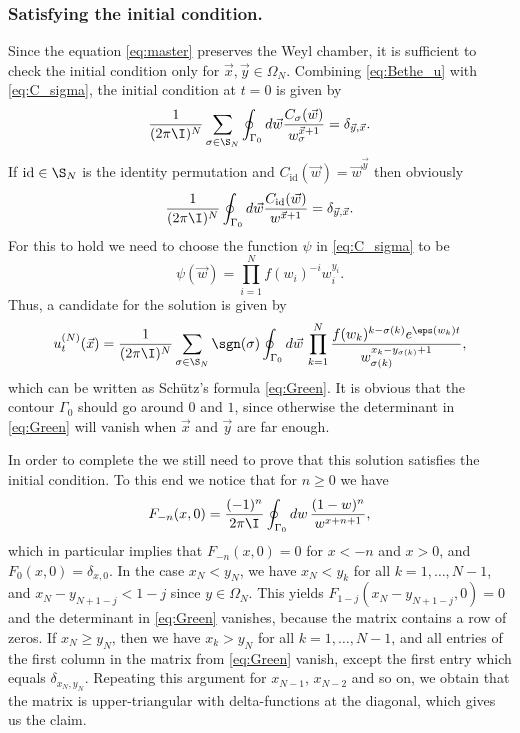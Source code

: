 \documentclass[]{pcmi}
\theoremstyle{plain}
\theoremstyle{definition}
\begin{document}
\subsubsection*{Satisfying the initial condition.}

Since the equation \eqref{eq:master} preserves the Weyl chamber, it is sufficient to check the initial condition only for $\vec x, \vec y \in \Omega_N$. Combining \eqref{eq:Bethe_u} with \eqref{eq:C_sigma}, the initial condition at $t = 0$ is given by
\begin{equation}\label{eq:u_init}
 	\frac{1}{(2\pi \I)^N} \sum_{\sigma \in \S_N} \oint_{\Gamma_0} d\vec w \frac{C_\sigma(\vec w)}{w_{\sigma}^{\vec x +1}} = \delta_{\vec y, \vec x}.
\end{equation}
If $\mathrm{id} \in \S_N$ is the identity permutation and $C_{\mathrm{id}}(\vec w) = \vec w^{\vec y}$ then obviously
\[
 	\frac{1}{(2\pi \I)^N} \oint_{\Gamma_0} d \vec w \frac{C_{\mathrm{id}}(\vec w)}{w^{\vec x +1}} = \delta_{\vec y, \vec x}.
\]
For this to hold we need to choose the function $\psi$ in \eqref{eq:C_sigma} to be
\[
	\psi(\vec w) = \prod_{i=1}^N f(w_{i})^{-i} w_i^{y_i}.
\]
Thus, a candidate for the solution is given by
\[
 	u^{(N)}_t(\vec x) = \frac{1}{(2\pi \I)^N} \sum_{\sigma \in \S_N} \sgn(\sigma) \oint_{\Gamma_0} d \vec w\, \prod_{k=1}^N \frac{f(w_{k})^{k - \sigma(k)} e^{\eps(w_k) t}}{w_{\sigma(k)}^{x_k - y_{\sigma(k)} +1}},
\]
which can be written as Sch\"{u}tz's formula \eqref{eq:Green}. It is obvious that the contour $\Gamma_{0}$ should go around $0$ and $1$, since otherwise the determinant in \eqref{eq:Green} will vanish when $\vec x$ and $\vec y$ are far enough. 

In order to complete the we still need to prove that this solution satisfies the initial condition. To this end we notice that for $n \geq 0$ we have
\[
 	F_{-n}(x, 0) =\frac{(-1)^n}{2\pi \I} \oint_{\Gamma_{0}} dw\,\frac{(1-w)^{n}}{w^{x+n+1}},
\]
which in particular implies that $F_{-n}(x, 0) = 0$ for $x < -n$ and $x > 0$, and $F_{0}(x, 0) = \delta_{x, 0}$. In the case $x_N < y_N$, we have $x_N < y_k$ for all $k = 1, \ldots, N-1$, and $x_N - y_{N+1 - j} < 1-j$ since $y \in \Omega_N$. This yields $F_{1 - j}(x_{N}-y_{N+1 - j},0) = 0$ and the determinant in \eqref{eq:Green} vanishes, because the matrix contains a row of zeros. If $x_N \geq y_N$, then we have $x_k > y_N$ for all $k = 1, \ldots, N-1$, and all entries of the first column in the matrix from \eqref{eq:Green} vanish, except the first entry which equals $\delta_{x_N, y_N}$. Repeating this argument for $x_{N-1}$, $x_{N-2}$ and so on, we obtain that the matrix is upper-triangular with delta-functions at the diagonal, which gives us the claim.
\end{document}

